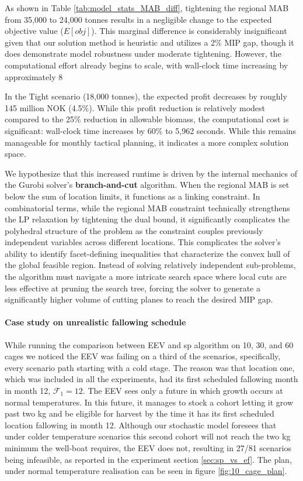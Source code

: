 \documentclass[12pt,a4paper]{article}
\begin{document}
As shown in Table \ref{tab:model_stats_MAB_diff}, tightening the regional MAB from 35,000 to 24,000 tonnes results in a negligible change to the expected objective value ($E[obj]$). This marginal difference is considerably insignificant given that our solution method is heuristic and utilizes a 2\% MIP gap, though it does demonstrate model robustness under moderate tightening. However, the computational effort already begins to scale, with wall-clock time increasing by approximately 8%

In the Tight scenario (18,000 tonnes), the expected profit decreases by roughly 145 million NOK (4.5\%). While this profit reduction is relatively modest compared to the 25\% reduction in allowable biomass, the computational cost is significant: wall-clock time increases by 60\% to 5,962 seconds. While this remains manageable for monthly tactical planning, it indicates a more complex solution space.

We hypothesize that this increased runtime is driven by the internal mechanics of the Gurobi solver’s \textbf{branch-and-cut} algorithm. When the regional MAB is set below the sum of location limits, it functions as a linking constraint. In combinatorial terms, while the regional MAB constraint technically strengthens the LP relaxation by tightening the dual bound, it significantly complicates the polyhedral structure of the problem as the constraint couples previously independent variables across different locations. This complicates the solver's ability to identify facet-defining inequalities that characterize the convex hull of the global feasible region. Instead of solving relatively independent sub-problems, the algorithm must navigate a more intricate search space where local cuts are less effective at pruning the search tree, forcing the solver to generate a significantly higher volume of cutting planes to reach the desired MIP gap.

\paragraph{Case study on unrealistic fallowing schedule}
While running the comparison between EEV and sp algorithm on 10, 30, and 60 cages we noticed the EEV was failing on a third of the scenarios, specifically, every scenario path starting with a cold stage. The reason was that location one, which was included in all the experiments, had its first scheduled fallowing month in month 12, $\mathcal{F}_1 = 12$. The EEV sees only a future in which growth occurs at normal temperatures. In this future, it manages to stock a cohort letting it grow past two kg and be eligible for harvest by the time it has its first scheduled location fallowing in month 12. Although our stochastic model foresees that under colder temperature scenarios this second cohort will not reach the two kg minimum the well-boat requires, the EEV does not, resulting in 27/81 scenarios being infeasible, as reported in the experiment section \ref{sec:sp_vs_ef}. The plan, under normal temperature realisation can be seen in figure \ref{fig:10_cage_plan}. 
\end{document}
